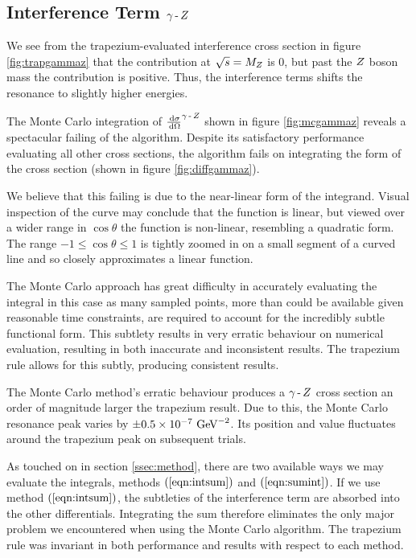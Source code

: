 \documentclass[]{article}
\providecommand{\e}[1]{\ensuremath{\times 10^{#1}}}
\begin{document}
\subsection{Interference Term $\gamma\operatorname{-}Z $}\label{ssec:interference}

We see from the trapezium-evaluated interference cross section in figure \ref{fig:trapgammaz} that the contribution at $\sqrt{s}=M_{Z }$ is $0$, but past the $Z $ boson mass the contribution is positive. Thus, the interference terms shifts the resonance to slightly higher energies.

The Monte Carlo integration of $\frac{\,\operatorname{d}\!{\sigma}}{\,\operatorname{d}\!{\Omega}}^{\gamma\operatorname{-}Z }$ shown in figure \ref{fig:mcgammaz} reveals a spectacular failing of the algorithm. Despite its satisfactory performance evaluating all other cross sections, the algorithm fails on integrating the form of the cross section (shown in figure \ref{fig:diffgammaz}).

We believe that this failing is due to the near-linear form of the integrand. Visual inspection of the curve may conclude that the function is linear, but viewed over a wider range in $\cos{\theta}$ the function is non-linear, resembling a quadratic form. The range $-1\leq\cos{\theta}\leq1$ is tightly zoomed in on a small segment of a curved line and so closely approximates a linear function.

The Monte Carlo approach has great difficulty in accurately evaluating the integral in this case as many sampled points, more than could be available given reasonable time constraints, are required to account for the incredibly subtle functional form. This subtlety results in very erratic behaviour on numerical evaluation, resulting in both inaccurate and inconsistent results. The trapezium rule allows for this subtly, producing consistent results.

The Monte Carlo method's erratic behaviour produces a $\gamma\operatorname{-}Z $ cross section an order of magnitude larger the trapezium result. Due to this, the Monte Carlo resonance peak varies by $\pm0.5\e{-7}\GeV^{-2}$. Its position and value fluctuates around the trapezium peak on subsequent trials.

As touched on in section \ref{ssec:method}, there are two available ways we may evaluate the integrals, methods $(\ref{eqn:intsum})$ and $(\ref{eqn:sumint})$. If we use method $(\ref{eqn:intsum})$, the subtleties of the interference term are absorbed into the other differentials. Integrating the sum therefore eliminates the only major problem we encountered when using the Monte Carlo algorithm. The trapezium rule was invariant in both performance and results with respect to each method.
\end{document}
